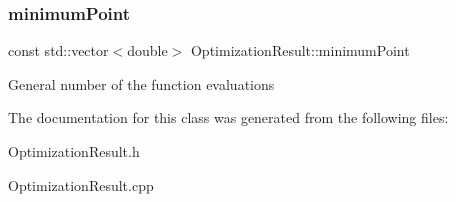 \subsubsection{\texorpdfstring{minimum\+Point}{minimumPoint}}
{\footnotesize\ttfamily const std\+::vector$<$double$>$ Optimization\+Result\+::minimum\+Point\hspace{0.3cm}{\ttfamily [private]}}

General number of the function evaluations 

The documentation for this class was generated from the following files\+:\begin{DoxyCompactItemize}
\item 
Optimization\+Result.\+h\item 
Optimization\+Result.\+cpp\end{DoxyCompactItemize}
